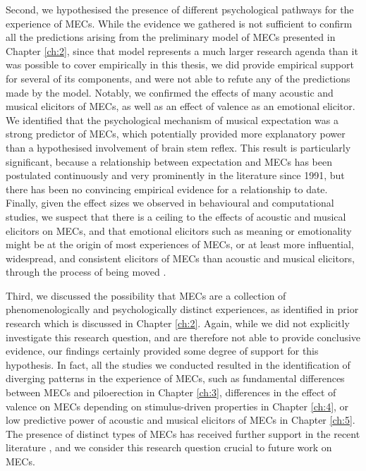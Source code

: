 Second, we hypothesised the presence of different psychological pathways for the experience of MECs. While the evidence we gathered is not sufficient to confirm all the predictions arising from the preliminary model of MECs presented in Chapter \ref{ch:2}, since that model represents a much larger research agenda than it was possible to cover empirically in this thesis, we did provide empirical support for several of its components, and were not able to refute any of the predictions made by the model. Notably, we confirmed the effects of many acoustic and musical elicitors of MECs, as well as an effect of valence as an emotional elicitor. We identified that the psychological mechanism of musical expectation was a strong predictor of MECs, which potentially provided more explanatory power than a hypothesised involvement of brain stem reflex. This result is particularly significant, because a relationship between expectation and MECs has been postulated continuously and very prominently in the literature since 1991, but there has been no convincing empirical evidence for a relationship to date. Finally, given the effect sizes we observed in behavioural and computational studies, we suspect that there is a ceiling to the effects of acoustic and musical elicitors on MECs, and that emotional elicitors such as meaning or emotionality might be at the origin of most experiences of MECs, or at least more influential, widespread, and consistent elicitors of MECs than acoustic and musical elicitors, through the process of being moved \parencite[for recent evidence of a strong relationship between MECs and being moved, see][]{vuoskoski2022}.

Third, we discussed the possibility that MECs are a collection of phenomenologically and psychologically distinct experiences, as identified in prior research which is discussed in Chapter \ref{ch:2}. Again, while we did not explicitly investigate this research question, and are therefore not able to provide conclusive evidence, our findings certainly provided some degree of support for this hypothesis. In fact, all the studies we conducted resulted in the identification of diverging patterns in the experience of MECs, such as fundamental differences between MECs and piloerection in Chapter \ref{ch:3}, differences in the effect of valence on MECs depending on stimulus-driven properties in Chapter \ref{ch:4}, or low predictive power of acoustic and musical elicitors of MECs in Chapter \ref{ch:5}. The presence of distinct types of MECs has received further support in the recent literature \parencite{bannister2020c,bannister2021}, and we consider this research question crucial to future work on MECs.


